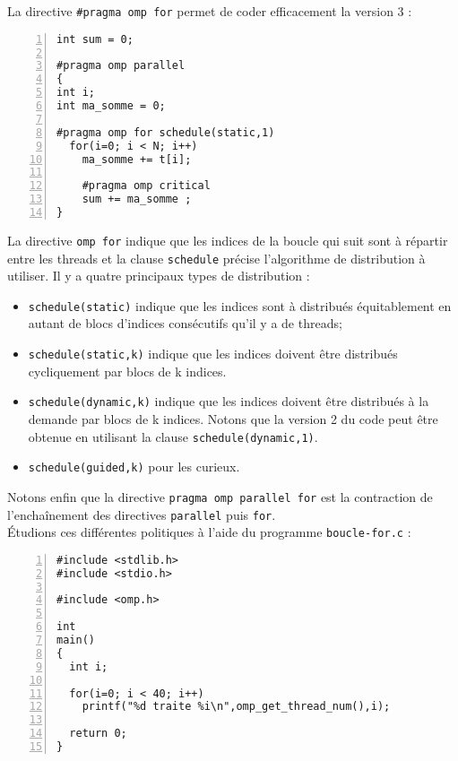 \documentclass[A4wide]{article}
\begin{document}
La directive \verb&#pragma omp for& permet de coder efficacement la
version 3 :

\begin{lstlisting}[numbers=left, numberstyle=\tiny, stepnumber=1,  numbersep=5pt]
int sum = 0;

#pragma omp parallel 
{
int i;
int ma_somme = 0; 
 
#pragma omp for schedule(static,1)
  for(i=0; i < N; i++)
    ma_somme += t[i];

    #pragma omp critical
    sum += ma_somme ;
}
\end{lstlisting}

La directive \verb#omp for# indique que les indices de la boucle qui
suit sont à répartir entre les threads et la clause \verb#schedule#
précise l'algorithme de distribution à utiliser. Il y a quatre principaux types de
distribution :


\begin{itemize}
\item \verb#schedule(static)# indique que les indices
sont à distribués équitablement en autant de blocs d'indices consécutifs qu'il y a
de threads;

\item \verb#schedule(static,k)# indique que les indices
doivent être distribués cycliquement par blocs de k indices.

\item \verb#schedule(dynamic,k)# indique que les indices doivent être
  distribués à la demande par blocs de k indices. Notons que la
  version 2 du code peut être obtenue en utilisant la clause
  \verb#schedule(dynamic,1)#.

\item \verb#schedule(guided,k)#  pour les curieux.
\end{itemize}

Notons enfin que la directive \verb#pragma omp parallel for# est la
contraction de l'enchaînement des directives \verb#parallel# puis \verb#for#.\\


Étudions ces différentes politiques à l'aide du programme \verb#boucle-for.c# :

\begin{lstlisting}[numbers=left, numberstyle=\tiny, stepnumber=1,  numbersep=5pt]
#include <stdlib.h>
#include <stdio.h>

#include <omp.h>

int 
main()
{
  int i;

  for(i=0; i < 40; i++)
    printf("%d traite %i\n",omp_get_thread_num(),i);

  return 0;
}
\end{lstlisting}
\end{document}

